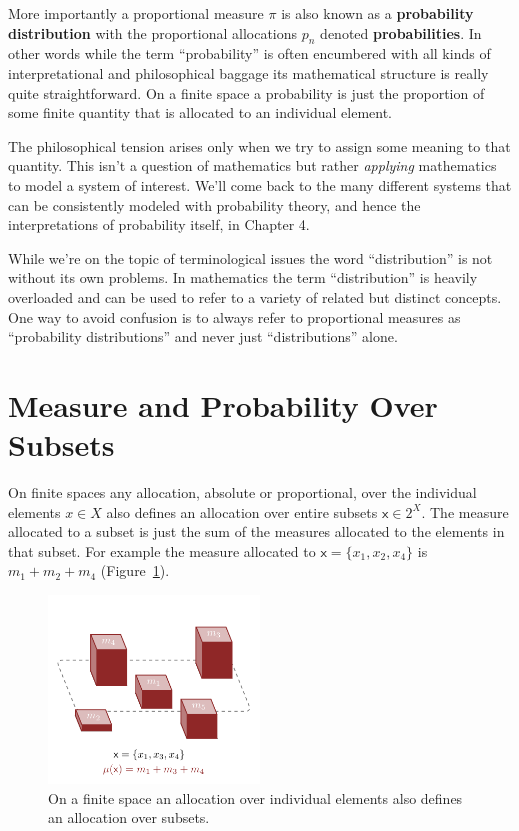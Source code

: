 \documentclass[
  letterpaper,
  DIV=11,
  numbers=noendperiod]{scrartcl}
\begin{document}
More importantly a proportional measure \(\pi\) is also known as a
\textbf{probability distribution} with the proportional allocations
\(p_{n}\) denoted \textbf{probabilities}. In other words while the term
``probability'' is often encumbered with all kinds of interpretational
and philosophical baggage its mathematical structure is really quite
straightforward. On a finite space a probability is just the proportion
of some finite quantity that is allocated to an individual element.

The philosophical tension arises only when we try to assign some meaning
to that quantity. This isn't a question of mathematics but rather
\emph{applying} mathematics to model a system of interest. We'll come
back to the many different systems that can be consistently modeled with
probability theory, and hence the interpretations of probability itself,
in Chapter 4.

While we're on the topic of terminological issues the word
``distribution'' is not without its own problems. In mathematics the
term ``distribution'' is heavily overloaded and can be used to refer to
a variety of related but distinct concepts. One way to avoid confusion
is to always refer to proportional measures as ``probability
distributions'' and never just ``distributions'' alone.

\hypertarget{measure-and-probability-over-subsets}{%
\section{Measure and Probability Over
Subsets}\label{measure-and-probability-over-subsets}}

On finite spaces any allocation, absolute or proportional, over the
individual elements \(x \in X\) also defines an allocation over entire
subsets \(\mathsf{x} \in 2^{X}\). The measure allocated to a subset is
just the sum of the measures allocated to the elements in that subset.
For example the measure allocated to
\(\mathsf{x} = \{ x_{1}, x_{2}, x_{4} \}\) is \(m_{1} + m_{2} + m_{4}\)
(Figure~\ref{fig-subset_measure}).

\begin{figure}

{\centering \includegraphics[width=0.5\textwidth,height=\textheight]{figures/subset_measure/subset_measure.pdf}

}

\caption{\label{fig-subset_measure}On a finite space an allocation over
individual elements also defines an allocation over subsets.}

\end{figure}
\end{document}
